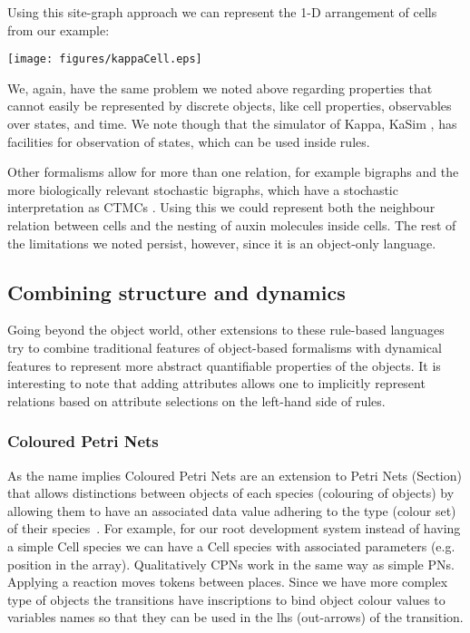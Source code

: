 \documentclass[phd]{infthesis}
\newcommand{\eg}{e.g.\xspace}
\begin{document}
Using this site-graph approach we can represent the 1-D arrangement of cells from
our example:
\begin{center}
    \texttt{[image: figures/kappaCell.eps]}
\end{center}
We, again, have the same problem we noted above regarding properties that cannot
easily be represented by discrete objects, like cell properties, observables
over states, and time. We note though that the simulator of Kappa, KaSim
\citep{KaSimManual2014}, has facilities for observation of states, which can
be used inside rules.

Other formalisms allow for more than one relation, for example bigraphs
\citep{milner1999communicating} and the more biologically relevant stochastic
bigraphs, which have a stochastic interpretation as CTMCs
\citep{krivine_stochastic_2008}. Using this we could represent both the
neighbour relation between cells and the nesting of auxin molecules inside
cells. The rest of the limitations we noted persist, however, since it is an
object-only language.

\subsection{Combining structure and dynamics}
Going beyond the object world, other extensions to these rule-based languages
try to combine traditional features of object-based formalisms with dynamical
features to represent more abstract quantifiable properties of the objects.
It is interesting to note that adding attributes allows one to implicitly represent
relations based on attribute selections on the left-hand side of rules.

\subsubsection*{Coloured Petri Nets}
As the name implies Coloured Petri Nets are an extension to Petri Nets (Section)
that allows distinctions between objects of each species (colouring of objects)
by allowing them to have an associated data value adhering to the type (colour
set) of their species~\citep{jensen_coloured_1987}. For example, for our root
development system instead of having a simple $\mathrm{Cell}$ species we can
have a $\mathrm{Cell}$ species with associated parameters (\eg position in the
array). Qualitatively CPNs work in the same way as simple PNs. Applying a
reaction moves tokens between places. Since we have more complex type of objects
the transitions have inscriptions to bind object colour values to variables
names so that they can be used in the lhs (out-arrows) of the transition.
\end{document}
